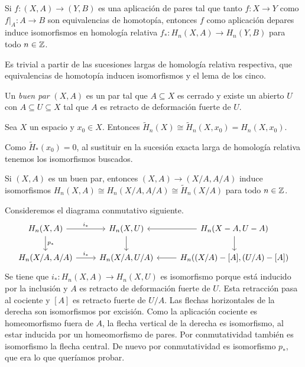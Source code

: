 \documentclass[TA.tex]{subfiles}
\begin{document}
\begin{prop}
Si $f:(X,A)\to (Y,B)$ es una aplicación de pares tal que tanto $f:X\to Y$ como $f|_A:A\to B$ son equivalencias de homotopía, entonces $f$ como aplicación depares induce isomorfismos en homología relativa $f_*:H_n(X,A)\to H_n(Y,B)$ para todo $n\in\mathbb{Z}$.
\end{prop}
\begin{dem}
Es trivial a partir de las sucesiones largas de homología relativa respectiva, que equivalencias de homotopía inducen isomorfismos y el lema de los cinco.
\end{dem}

\begin{defi}
Un \emph{buen par} $(X,A)$ es un par tal que $A\subseteq X$ es cerrado y existe un abierto $U$ con $A\subseteq U\subseteq X$ tal que $A$ es retracto de deformación fuerte de $U$.
\end{defi}


\begin{prop}
Sea $X$ un espacio y $x_0\in X$. Entonces $\widetilde{H}_n(X)\cong\widetilde{H}_n(X,x_0)=H_n(X,x_0)$.
\end{prop}
\begin{dem}
Como $\widetilde{H}_*(x_0)=0$, al sustituir en la sucesión exacta larga de homología relativa tenemos los isomorfismos buscados.
\end{dem}

\begin{prop}
Si $(X,A)$ es un buen par, entonces $(X,A)\to (X/A,A/A)$ induce isomorfismos $H_n(X,A)\cong H_n(X/A,A/A)\cong\widetilde{H}_n(X/A)$ para todo $n\in\mathbb{Z}$. 
\end{prop}
\begin{dem}
Consideremos el diagrama conmutativo siguiente.
\[
\begin{tikzcd}
H_n(X,A)\arrow[d,"p_*"]\arrow[r,"i_*"] & H_n(X,U)\arrow[d]&H_n(X-A,U-A)\arrow[l]\arrow[d]\\
H_n(X/A,A/A)\arrow[r, "i_*"]& H_n(X/A, U/A) &\arrow[l]H_n((X/A)-[A], (U/A)-[A])
\end{tikzcd}
\]
Se tiene que $i_*:H_n(X,A)\to H_n(X,U) $ es isomorfismo porque está inducido por la inclusión y $A$ es retracto de deformación fuerte de $U$. Esta retracción pasa al cociente y $[A]$ es retracto fuerte de $U/A$. Las flechas horizontales de la derecha son isomorfismos por excisión. Como la aplicación cociente es homeomorfismo fuera de $A$, la flecha vertical de la derecha es isomorfismo, al estar inducida por un homeomorfismo de pares. Por conmutatividad también es isomorfismo la flecha central. De nuevo por conmutatividad es isomorfismo $p_*$, que era lo que queríamos probar. 
\end{dem}
\end{document}
